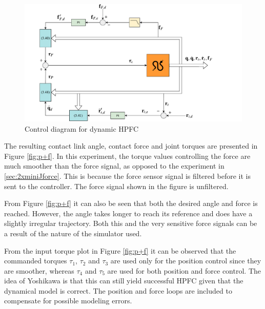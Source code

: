 \begin{figure}
    \centering
    \includegraphics[trim=1cm 0cm 3cm 0cm, clip=true, width=\textwidth]{figures/experiments/control-diagrams/pf-control-diagram.pdf}
    \caption{Control diagram for dynamic HPFC}
    \label{fig:diag-pf}
\end{figure}

The resulting contact link angle, contact force and joint torques are presented in Figure \ref{fig:p+f}. In this experiment, the torque values controlling the force are much smoother than the force signal, as opposed to the experiment in \ref{sec:2xminiJforce}. This is because the force sensor signal is filtered before it is sent to the controller. The force signal shown in the figure is unfiltered.

From Figure \ref{fig:p+f} it can also be seen that both the desired angle and force is reached. However, the angle takes longer to reach its reference and does have a slightly irregular trajectory. Both this and the very sensitive force signals can be a result of the nature of the simulator used.

From the input torque plot in Figure \ref{fig:p+f} it can be observed that the commanded torques $\tau_1$, $\tau_2$ and $\tau_3$ are used only for the position control since they are smoother, whereas $\tau_4$ and $\tau_5$ are used for both position and force control. The idea of Yoshikawa \cite{yoshikawa1987dynamic} is that this can still yield successful HPFC given that the dynamical model is correct. The position and force loops are included to compensate for possible modeling errors.

